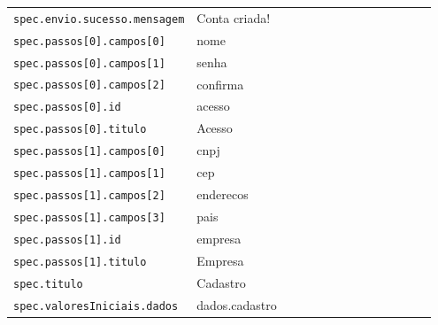\begin{tabular}{@{}p{0.35\linewidth}p{0.6\linewidth}@{}}
\texttt{spec.envio.sucesso.mensagem} & Conta criada! \\
\texttt{spec.passos[0].campos[0]} & nome \\
\texttt{spec.passos[0].campos[1]} & senha \\
\texttt{spec.passos[0].campos[2]} & confirma \\
\texttt{spec.passos[0].id} & acesso \\
\texttt{spec.passos[0].titulo} & Acesso \\
\texttt{spec.passos[1].campos[0]} & cnpj \\
\texttt{spec.passos[1].campos[1]} & cep \\
\texttt{spec.passos[1].campos[2]} & enderecos \\
\texttt{spec.passos[1].campos[3]} & pais \\
\texttt{spec.passos[1].id} & empresa \\
\texttt{spec.passos[1].titulo} & Empresa \\
\texttt{spec.titulo} & Cadastro \\
\texttt{spec.valoresIniciais.dados} & dados.cadastro \\
\end{tabular}

